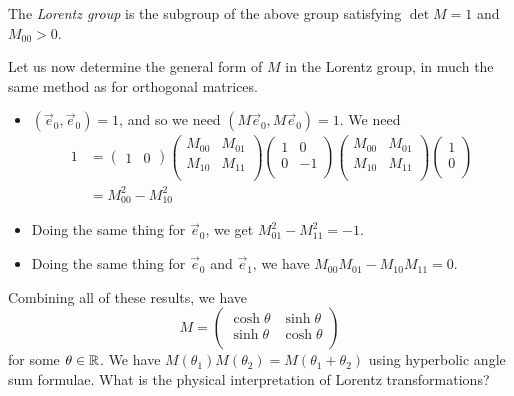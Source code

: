 \documentclass{../template/note}
\begin{document}
    \begin{definition}
        The \emph{Lorentz group} is the subgroup of the above group satisfying \(\det M = 1\) and \(M_{00} > 0\).
    \end{definition}
    Let us now determine the general form of \(M\) in the Lorentz group, in much the same method as for orthogonal matrices.
    \begin{itemize}
        \item \((\vec e_0, \vec e_0) = 1\), and so we need \((M \vec e_0, M \vec e_0) = 1\). We need
        \begin{align*}
            1 &= \begin{pmatrix}
             1 & 0
            \end{pmatrix} \begin{pmatrix}
             M_{00} & M_{01} \\
             M_{10} & M_{11} \\
            \end{pmatrix} \begin{pmatrix}
             1 & 0 \\
             0 & -1 \\
            \end{pmatrix} \begin{pmatrix}
             M_{00} & M_{01} \\
             M_{10} & M_{11} \\
            \end{pmatrix} \begin{pmatrix}
             1 \\
             0 \\
            \end{pmatrix} \\
            &= M_{00}^2 - M_{10}^2
        \end{align*}
        \item Doing the same thing for \(\vec e_0\), we get \(M_{01}^2 - M_{11}^2 = -1\).
        \item Doing the same thing for \(\vec e_0\) and \(\vec e_1\), we have \(M_{00}M_{01}-M_{10}M_{11}=0\).
    \end{itemize}
    Combining all of these results, we have
    \[
        M = \begin{pmatrix}
         \cosh \theta & \sinh \theta \\
         \sinh \theta & \cosh \theta \\
        \end{pmatrix}
    \]
    for some \(\theta \in \mathbb R\). We have \(M(\theta_1)M(\theta_2) = M(\theta_1 + \theta_2)\) using hyperbolic angle sum formulae. What is the physical interpretation of Lorentz transformations?
    
\end{document}
